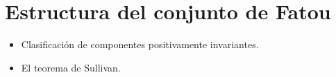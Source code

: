 \chapter{Estructura del conjunto de Fatou}

\begin{itemize}
    \item Clasificación de componentes positivamente invariantes.
    \item El teorema de Sullivan.
\end{itemize}